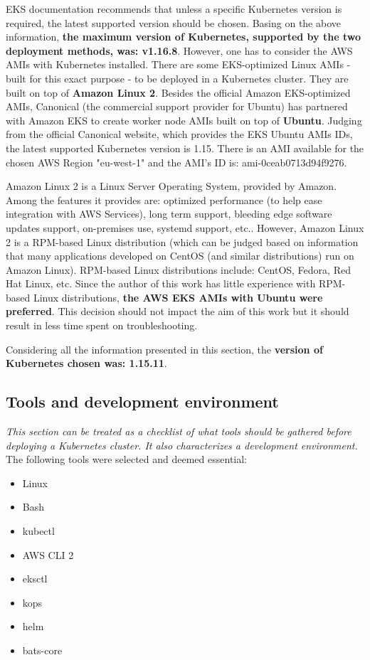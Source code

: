 EKS documentation recommends that unless a specific Kubernetes version is required, the latest supported version should be chosen\cite{online-eks-versions}. Basing on the above information, \textbf{the maximum version of Kubernetes, supported by the two deployment methods, was: v1.16.8}. However, one has to consider the AWS AMIs with Kubernetes installed. There are some EKS-optimized Linux AMIs - built for this exact purpose - to be deployed in a Kubernetes cluster. They are built on top of \textbf{Amazon Linux 2}\cite{eks-optimized-ami}. Besides the official Amazon EKS-optimized AMIs, Canonical (the commercial support provider for Ubuntu) has partnered with Amazon EKS to create worker node AMIs built on top of \textbf{Ubuntu}\cite{eks-ubu}. Judging from the official Canonical website, which provides the EKS Ubuntu AMIs IDs, the latest supported Kubernetes version is 1.15. There is an AMI available for the chosen AWS Region "eu-west-1" and the AMI's ID is: ami-0ceab0713d94f9276\cite{eks-ubu-ami-id}.

Amazon Linux 2 is a Linux Server Operating System, provided by Amazon. Among the features it provides are: optimized performance (to help ease integration with AWS Services), long term support, bleeding edge software updates support, on-premises use, systemd support, etc.\cite{al2}. However, Amazon Linux 2 is a RPM-based Linux distribution (which can be judged based on information that many applications developed on CentOS (and similar distributions) run on Amazon Linux)\cite{al2-centos}. RPM-based Linux distributions include: CentOS, Fedora, Red Hat Linux, etc. Since the author of this work has little experience with RPM-based Linux distributions, \textbf{the AWS EKS AMIs with Ubuntu were preferred}. This decision should not impact the aim of this work but it should result in less time spent on troubleshooting.

Considering all the information presented in this section, the \textbf{version of Kubernetes chosen was: 1.15.11}.



\subsection{Tools and development environment}
\label{tools}
\textit{This section can be treated as a checklist of what tools should be gathered before deploying a Kubernetes cluster. It also characterizes a development environment.}
\\

The following tools were selected and deemed essential:
\begin{itemize}
\item Linux
\item Bash
\item kubectl
\item AWS CLI 2
\item eksctl
\item kops
\item helm
\item bats-core
\end{itemize}

